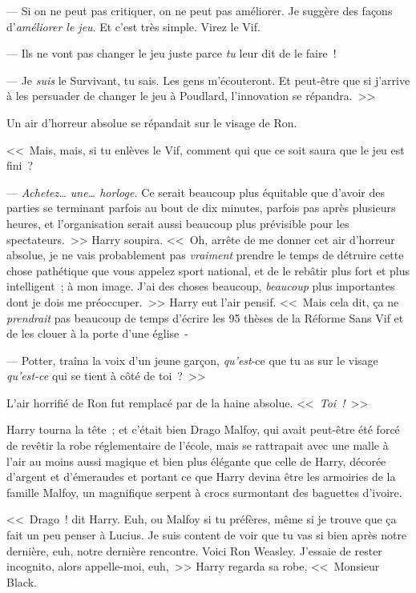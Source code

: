 --- Si on ne peut pas critiquer, on ne peut pas améliorer. Je suggère des façons d'\emph{améliorer le jeu}. Et c'est très simple. Virez le Vif.

--- Ils ne vont pas changer le jeu juste parce \emph{tu} leur dit de le faire~!

--- Je \emph{suis} le Survivant, tu sais. Les gens m'écouteront. Et peut-être que si j'arrive à les persuader de changer le jeu à Poudlard, l'innovation se répandra.~>>

Un air d'horreur absolue se répandait sur le visage de Ron. 

<<~Mais, mais, si tu enlèves le Vif, comment qui que ce soit saura que le jeu est fini~?

--- \emph{Achetez… une… horloge.} Ce serait beaucoup plus équitable que d'avoir des parties se terminant parfois au bout de dix minutes, parfois pas après plusieurs heures, et l'organisation serait aussi beaucoup plus prévisible pour les spectateurs.~>> Harry soupira. <<~Oh, arrête de me donner cet air d'horreur absolue, je ne vais probablement pas \emph{vraiment} prendre le temps de détruire cette chose pathétique que vous appelez sport national, et de le rebâtir plus fort et plus intelligent~; à mon image. J'ai des choses beaucoup, \emph{beaucoup} plus importantes dont je dois me préoccuper.~>> Harry eut l'air pensif. <<~Mais cela dit, ça ne \emph{prendrait} pas beaucoup de temps d'écrire les 95 thèses de la Réforme Sans Vif et de les clouer à la porte d'une église~-

--- Potter, traîna la voix d'un jeune garçon, \emph{qu'est}-ce que tu as sur le visage \emph{qu'est-ce} qui se tient à côté de toi~?~>>

L'air horrifié de Ron fut remplacé par de la haine absolue. <<~\emph{Toi~!}~>>

Harry tourna la tête~; et c'était bien Drago Malfoy, qui avait peut-être été forcé de revêtir la robe réglementaire de l'école, mais se rattrapait avec une malle à l'air au moins aussi magique et bien plus élégante que celle de Harry, décorée d'argent et d'émeraudes et portant ce que Harry devina être les armoiries de la famille Malfoy, un magnifique serpent à crocs surmontant des baguettes d'ivoire.

<<~Drago~! dit Harry. Euh, ou Malfoy si tu préfères, même si je trouve que ça fait un peu penser à Lucius. Je suis content de voir que tu vas si bien après notre dernière, euh, notre dernière rencontre. Voici Ron Weasley. J'essaie de rester incognito, alors appelle-moi, euh,~>> Harry regarda sa robe, <<~Monsieur Black.

